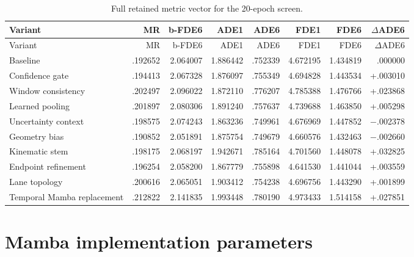 \begingroup
\scriptsize
\setlength{\tabcolsep}{2.2pt}
\setlength\LTleft{0pt}
\setlength\LTright{0pt}
\begin{longtable}{p{}rrrrrrr}
\caption{Full retained metric vector for the 20-epoch screen.}\label{tab:appendix-screen}\\
\hline
Variant & MR & b-FDE6 & ADE1 & ADE6 & FDE1 & FDE6 & $\Delta$ADE6 \\
\hline
\endfirsthead
\hline
Variant & MR & b-FDE6 & ADE1 & ADE6 & FDE1 & FDE6 & $\Delta$ADE6 \\
\hline
\endhead
Baseline & .192652 & 2.064007 & 1.886442 & .752339 & 4.672195 & 1.434819 & .000000 \\
Confidence gate & .194413 & 2.067328 & 1.876097 & .755349 & 4.694828 & 1.443534 & +.003010 \\
Window consistency & .202497 & 2.096022 & 1.872110 & .776207 & 4.785388 & 1.476766 & +.023868 \\
Learned pooling & .201897 & 2.080306 & 1.891240 & .757637 & 4.739688 & 1.463850 & +.005298 \\
Uncertainty context & .198575 & 2.074243 & 1.863236 & .749961 & 4.676969 & 1.447852 & $-$.002378 \\
Geometry bias & .190852 & 2.051891 & 1.875754 & .749679 & 4.660576 & 1.432463 & $-$.002660 \\
Kinematic stem & .198175 & 2.068197 & 1.942671 & .785164 & 4.701560 & 1.448078 & +.032825 \\
Endpoint refinement & .196254 & 2.058200 & 1.867779 & .755898 & 4.641530 & 1.441044 & +.003559 \\
Lane topology & .200616 & 2.065051 & 1.903412 & .754238 & 4.696756 & 1.443290 & +.001899 \\
Temporal Mamba replacement & .212822 & 2.141835 & 1.993448 & .780190 & 4.973433 & 1.514158 & +.027851 \\
\hline
\end{longtable}
\endgroup

\section{Mamba implementation parameters}

